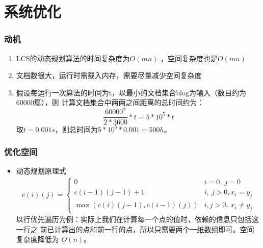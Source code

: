 \documentclass[11pt,presentation]{beamer}
\begin{document}
\section{系统优化}
\label{sec-3}
\begin{frame}
\frametitle{动机}
\label{sec-3-1}

\begin{enumerate}
\item LCS的动态规划算法的时间复杂度为\(O(mn)\) ，空间复杂度也是\(O(mn)\)
\item 文档数很大，运行时需载入内存，需要尽量减少空间复杂度
\item 假设每运行一次算法的时间为t，以最小的文档集合blog为输入（数目约为60000篇），则
   计算文档集合中两两之间距离的总时间约为：
   \[
   \frac{60000^2}{2 * 3600}*t=5*10^5*t
   \]
   取\(t=0.001s\)，则总时间为\(5*10^5*0.001=500h\)。
\end{enumerate}
\end{frame}
\begin{frame}
\frametitle{优化空间}
\label{sec-3-2}

\begin{itemize}
\item 动态规划原理式
     \begin{eqnarray*}
       c(i)(j) =
       \begin{cases}
         0 & i = 0,\: j = 0\\
         c(i-1)(j-1) + 1 & i,\: j > 0, x_i=y_j\\
         \max(c(i)(j-1), c(i-1)(j)) & i, j > 0,\: x_i \ne y_j
       \end{cases}
     \end{eqnarray*}
     以行优先遍历为例：实际上我们在计算每一个点的值时，依赖的信息只包括这一行之
     前已计算出的点和前一行的点，所以只需要两个一维数组即可。空间复杂度降低为
     \(O(n)\)。
\end{itemize}
\end{frame}
\end{document}
